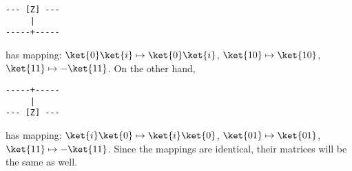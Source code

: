 \begingroup
%
\begin{verbatim}
--- [Z] ---
     |
-----+-----
\end{verbatim}
%
has mapping: $\ket{0} \ket{i} \mapsto \ket{0} \ket{i}$, $\ket{10} \mapsto \ket{10}$, $\ket{11} \mapsto -\ket{11}$.
%
On the other hand,
%
\begin{verbatim}
-----+-----
     |
--- [Z] ---
\end{verbatim}
%
has mapping: $\ket{i} \ket{0} \mapsto \ket{i} \ket{0}$, $\ket{01} \mapsto \ket{01}$, $\ket{11} \mapsto -\ket{11}$.
%
Since the mappings are identical, their matrices will be the same as well.
%
\endgroup
